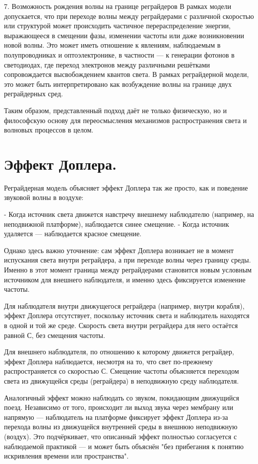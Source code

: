 \documentclass[12pt]{article}
\begin{document}
7. Возможность рождения волны на границе реграйдеров
В рамках модели допускается, что при переходе волны между реграйдерами с различной скоростью или структурой может происходить частичное перераспределение энергии, выражающееся в смещении фазы, изменении частоты или даже возникновении новой волны. Это может иметь отношение к явлениям, наблюдаемым в полупроводниках и оптоэлектронике, в частности — к генерации фотонов в светодиодах, где переход электронов между различными решётками сопровождается высвобождением квантов света. В рамках реграйдерной модели, это может быть интерпретировано как возбуждение волны на границе двух реграйдерных сред.

Таким образом, представленный подход даёт не только физическую, но и философскую основу для переосмысления механизмов распространения света и волновых процессов в целом.


\section*{Эффект Доплера.}

Реграйдерная модель объясняет эффект Доплера так же просто, как и поведение звуковой волны в воздухе:

- Когда источник света движется навстречу внешнему наблюдателю (например, на неподвижной платформе), наблюдается синее смещение.
- Когда источник удаляется — наблюдается красное смещение.

Однако здесь важно уточнение: сам эффект Доплера возникает не в момент испускания света внутри реграйдера, а при переходе волны через границу среды. Именно в этот момент граница между реграйдерами становится новым условным источником для внешнего наблюдателя, и именно здесь фиксируется изменение частоты.

Для наблюдателя внутри движущегося реграйдера (например, внутри корабля), эффект Доплера отсутствует, поскольку источник света и наблюдатель находятся в одной и той же среде. Скорость света внутри реграйдера для него остаётся равной С, без смещения частоты.

Для внешнего наблюдателя, по отношению к которому движется реграйдер, эффект Доплера наблюдается, несмотря на то, что свет по-прежнему распространяется со скоростью С. Смещение частоты объясняется переходом света из движущейся среды (реграйдера) в неподвижную среду наблюдателя.

Аналогичный эффект можно наблюдать со звуком, покидающим движущийся поезд. Независимо от того, происходит ли выход звука через мембрану или напрямую — наблюдатель на платформе фиксирует эффект Доплера из-за перехода волны из движущейся внутренней среды в внешнюю неподвижную (воздух). Это подчёркивает, что описанный эффект полностью согласуется с наблюдаемой практикой — и может быть объяснён "без прибегания к понятию искривления времени или пространства".
\end{document}
